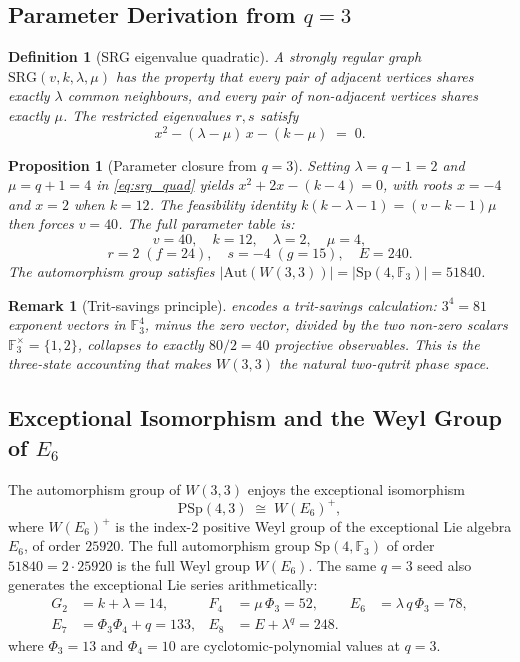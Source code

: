 ﻿\documentclass[12pt]{article}
\newtheorem{proposition}[theorem]{Proposition}
\newtheorem{definition}[theorem]{Definition}
\newtheorem{remark}[theorem]{Remark}
\newcommand{\FF}{\mathbb{F}}
\newcommand{\Sp}{\mathrm{Sp}}
\newcommand{\PSp}{\mathrm{PSp}}
\newcommand{\SRG}[4]{\mathrm{SRG}(#1,#2,#3,#4)}
\newcommand{\GF}[1]{\mathbb{F}_{#1}}
\newcommand{\Aut}{\mathrm{Aut}}
\begin{document}
\subsection{Parameter Derivation from $q=3$}

\begin{definition}[SRG eigenvalue quadratic]\label{def:srg}
A strongly regular graph $\SRG{v}{k}{\lambda}{\mu}$ has the property that every pair
of adjacent vertices shares exactly $\lambda$ common neighbours, and every pair of
non-adjacent vertices shares exactly $\mu$.  The restricted eigenvalues $r, s$ satisfy
\begin{equation}
  x^2 - (\lambda - \mu)\,x - (k - \mu) \;=\; 0.
  \label{eq:srg_quad}
\end{equation}
\end{definition}

\begin{proposition}[Parameter closure from $q=3$]\label{prop:params}
Setting $\lambda = q-1 = 2$ and $\mu = q+1 = 4$ in \cref{eq:srg_quad} yields
$x^2 + 2x - (k-4) = 0$, with roots $x = -4$ and $x = 2$ when $k = 12$.  The
feasibility identity $k(k-\lambda-1) = (v-k-1)\mu$ then forces $v = 40$.  The full
parameter table is:
\[
  v = 40,\quad k = 12,\quad \lambda = 2,\quad \mu = 4,
\]
\[
  r = 2 \;(f = 24), \quad s = -4 \;(g = 15), \quad E = 240.
\]
The automorphism group satisfies $|\Aut(W(3,3))| = |\Sp(4,\FF_3)| = 51840$.
\end{proposition}

\begin{remark}[Trit-savings principle]
 encodes a \emph{trit-savings} calculation: $3^4 = 81$ exponent vectors
in $\GF{3}^4$, minus the zero vector, divided by the two non-zero scalars
$\GF{3}^\times = \{1,2\}$, collapses to exactly $80/2 = 40$ projective observables.
This is the three-state accounting that makes $W(3,3)$ the natural two-qutrit phase
space.
\end{remark}

\subsection{Exceptional Isomorphism and the Weyl Group of \texorpdfstring{$E_6$}{E6}}

The automorphism group of $W(3,3)$ enjoys the exceptional isomorphism
\begin{equation}
  \PSp(4,3) \;\cong\; W(E_6)^+,
\end{equation}
where $W(E_6)^+$ is the index-2 positive Weyl group of the exceptional Lie algebra
$E_6$, of order $25920$.  The full automorphism group $\Sp(4,\FF_3)$ of order
$51840 = 2 \cdot 25920$ is the full Weyl group $W(E_6)$.  The same $q=3$ seed also
generates the exceptional Lie series arithmetically:
\begin{equation}
\begin{aligned}
  G_2 &= k + \lambda = 14, &
  F_4 &= \mu\,\Phi_3 = 52, &
  E_6 &= \lambda\,q\,\Phi_3 = 78,\\
  E_7 &= \Phi_3\Phi_4 + q = 133, &
  E_8 &= E + \lambda^q = 248.
\end{aligned}
\end{equation}
where $\Phi_3 = 13$ and $\Phi_4 = 10$ are cyclotomic-polynomial values at $q=3$.
\end{document}
